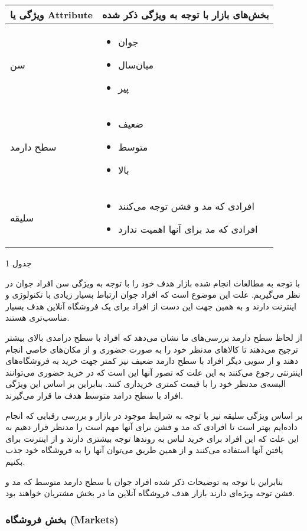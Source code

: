 \documentclass[]{article}
\begin{document}
\begin{longtable}[]{@{}ll@{}}
\toprule
ویژگی یا Attribute & بخش‌های بازار با توجه به ویژگی ذکر
شده\tabularnewline
\midrule
\endhead
سن & \begin{itemize}
\item
  جوان
\item
  میان‌سال
\item
  پیر
\end{itemize}\tabularnewline
سطح دارمد & \begin{itemize}
\item
  ضعیف
\item
  متوسط
\item
  بالا
\end{itemize}\tabularnewline
سلیقه & \begin{itemize}
\item
  افرادی که مد و فشن توجه می‌کنند
\item
  افرادی که مد برای آنها اهمیت ندارد
\end{itemize}\tabularnewline
\bottomrule
\end{longtable}

جدول 1

با توجه به مطالعات انجام شده بازار هدف خود را با توجه به ویژگی سن افراد
جوان در نظر می‌گیریم. علت این موضوع است که افراد جوان ارتباط بسیار زیادی
با تکنولوژی و اینترنت دارند و به همین جهت این دست از افراد برای یک
فروشگاه آنلاین هدف بسیار مناسب‌تری هستند.

از لحاظ سطح دارمد بررسی‌های ما نشان می‌دهد که افراد با سطح درامدی بالای
بیشتر ترجیح می‌دهند تا کالاهای مدنظر خود را به صورت حضوری و از مکان‌های
خاصی انجام دهند و از سویی دیگر افراد با سطح دارمد ضعیف نیز کمتر جهت خرید
به فروشگاه‌های اینترنتی رجوع می‌کنند به این علت که تصور آنها این است که
در خرید حضوری می‌توانند البسه‌ی مدنظر خود را با قیمت کمتری خریداری کنند.
بنابراین بر اساس این ویژگی افراد با سطح درامد متوسط هدف ما قرار
می‌گیرند.

بر اساس ویژگی سلیقه نیز با توجه به شرایط موجود در بازار و بررسی رقبایی
که انجام داده‌ایم بهتر است تا افرادی که مد و فشن برای آنها مهم است را
مدنظر قرار دهیم به این علت که این افراد برای خرید لباس به روندها توجه
بیشتری دارند و از اینترنت برای یافتن آنها استفاده می‌کنند و از همین طریق
می‌توان آنها را به فروشگاه خود جذب بکنیم.

بنابراین با توجه به توضیحات ذکر شده افراد جوان با سطح دارمد متوسط که مد
و فشن توجه ویژه‌ای دارند بازار هدف فروشگاه آنلاین ما در بخش مشتریان
خواهند بود.

\subsubsection{بخش فروشگاه
(Markets)}\label{ux628ux62eux634-ux641ux631ux648ux634ux6afux627ux647-markets}
\end{document}

